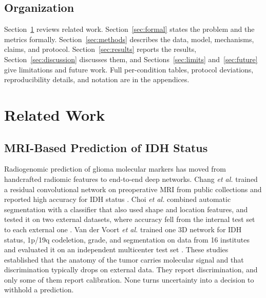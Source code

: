 \documentclass[journal]{IEEEtran}
\begin{document}
\subsection{Organization}
Section~\ref{sec:related} reviews related work. Section~\ref{sec:formal} states the problem and the metrics formally. Section~\ref{sec:methods} describes the data, model, mechanisms, claims, and protocol. Section~\ref{sec:results} reports the results, Section~\ref{sec:discussion} discusses them, and Sections~\ref{sec:limits} and~\ref{sec:future} give limitations and future work. Full per-condition tables, protocol deviations, reproducibility details, and notation are in the appendices.

\section{Related Work}
\label{sec:related}

\subsection{MRI-Based Prediction of IDH Status}
Radiogenomic prediction of glioma molecular markers has moved from handcrafted radiomic features to end-to-end deep networks. Chang \emph{et al.} trained a residual convolutional network on preoperative MRI from public collections and reported high accuracy for IDH status \cite{chang2018}. Choi \emph{et al.} combined automatic segmentation with a classifier that also used shape and location features, and tested it on two external datasets, where accuracy fell from the internal test set to each external one \cite{choi2021}. Van der Voort \emph{et al.} trained one 3D network for IDH status, 1p/19q codeletion, grade, and segmentation on data from 16 institutes and evaluated it on an independent multicenter test set \cite{vandervoort2023}. These studies established that the anatomy of the tumor carries molecular signal and that discrimination typically drops on external data. They report discrimination, and only some of them report calibration. None turns uncertainty into a decision to withhold a prediction.
\end{document}
